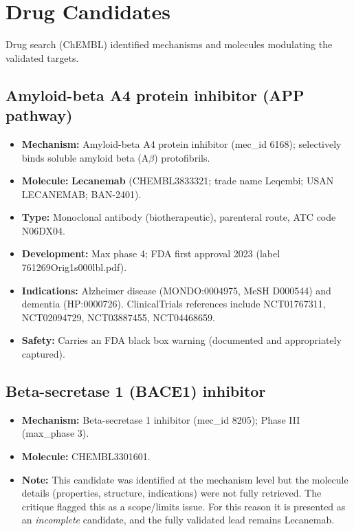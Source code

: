 \documentclass{article}
\begin{document}
\section{Drug Candidates}
Drug search (ChEMBL) identified mechanisms and molecules modulating the validated targets.

\subsection{Amyloid-beta A4 protein inhibitor (APP pathway)}
\begin{itemize}
    \item \textbf{Mechanism:} Amyloid-beta A4 protein inhibitor (mec\_id 6168); selectively binds soluble amyloid beta (A$\beta$) protofibrils.
    \item \textbf{Molecule:} \textbf{Lecanemab} (CHEMBL3833321; trade name Leqembi; USAN LECANEMAB; BAN-2401).
    \item \textbf{Type:} Monoclonal antibody (biotherapeutic), parenteral route, ATC code N06DX04.
    \item \textbf{Development:} Max phase 4; FDA first approval 2023 (label 761269Orig1s000lbl.pdf).
    \item \textbf{Indications:} Alzheimer disease (MONDO:0004975, MeSH D000544) and dementia (HP:0000726). ClinicalTrials references include NCT01767311, NCT02094729, NCT03887455, NCT04468659.
    \item \textbf{Safety:} Carries an FDA black box warning (documented and appropriately captured).
\end{itemize}

\subsection{Beta-secretase 1 (BACE1) inhibitor}
\begin{itemize}
    \item \textbf{Mechanism:} Beta-secretase 1 inhibitor (mec\_id 8205); Phase III (max\_phase 3).
    \item \textbf{Molecule:} CHEMBL3301601.
    \item \textbf{Note:} This candidate was identified at the mechanism level but the molecule details (properties, structure, indications) were not fully retrieved. The critique flagged this as a scope/limits issue. For this reason it is presented as an \emph{incomplete} candidate, and the fully validated lead remains Lecanemab.
\end{itemize}
\end{document}
